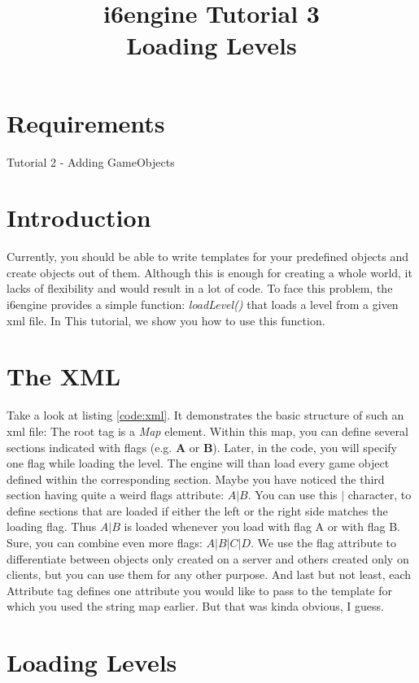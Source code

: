 \documentclass{article}
\title{i6engine Tutorial 3 \\ Loading Levels}
\begin{document}
\section{Requirements}

Tutorial 2 - Adding GameObjects

\section{Introduction}

Currently, you should be able to write templates for your predefined objects and create objects out of them. Although this is enough for creating a whole world, it lacks of flexibility and would result in a lot of code. To face this problem, the i6engine provides a simple function: \textit{loadLevel()} that loads a level from a given xml file. In This tutorial, we show you how to use this function.

\section{The XML}

Take a look at listing \ref{code:xml}. It demonstrates the basic structure of such an xml file: The root tag is a \textit{Map} element. Within this map, you can define several sections indicated with flags (e.g. \textbf{A} or \textbf{B}). Later, in the code, you will specify one flag while loading the level. The engine will than load every game object defined within the corresponding section. Maybe you have noticed the third section having quite a weird flags attribute: \textbf{$A|B$}. You can use this \textbf{$|$} character, to define sections that are loaded if either the left or the right side matches the loading flag. Thus \textbf{$A|B$} is loaded whenever you load with flag A or with flag B. Sure, you can combine even more flags: \textbf{$A|B|C|D$}. We use the flag attribute to differentiate between objects only created on a server and others created only on clients, but you can use them for any other purpose. And last but not least, each Attribute tag defines one attribute you would like to pass to the template for which you used the string map earlier. But that was kinda obvious, I guess.



\section{Loading Levels}
\end{document}

